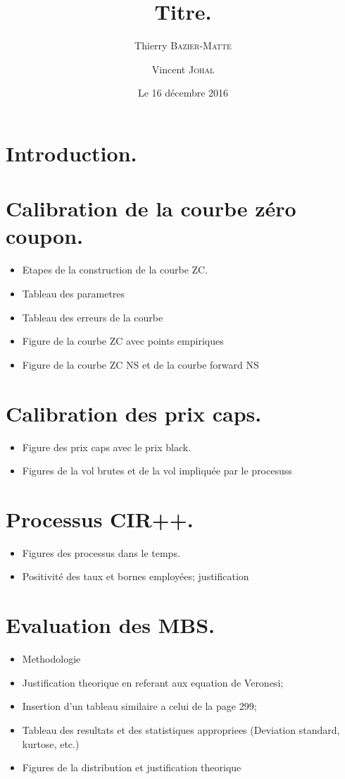 \documentclass{article}
\title{Titre.}
\author{Thierry \textsc{Bazier-Matte} \and Vincent \textsc{Johal}}
\date{Le 16 décembre 2016}
\begin{document}
\maketitle

\section{Introduction.}

\section{Calibration de la courbe zéro coupon.}

\begin{itemize}
\item Etapes de la construction de la courbe ZC.
\item Tableau des parametres
\item Tableau des erreurs de la courbe
\item Figure de la courbe ZC avec points empiriques
\item Figure de la courbe ZC NS et de la courbe forward NS
\end{itemize}

\section{Calibration des prix caps.}

\begin{itemize}
\item Figure des prix caps avec le prix black.
\item Figures de la vol brutes et de la vol impliquée par le procesuss
\end{itemize}

\section{Processus CIR++.}
\begin{itemize}
\item Figures des processus dans le temps.
\item Positivité des taux et bornes employées; justification
\end{itemize}

\section{Evaluation des MBS.}
\begin{itemize}
\item Methodologie
\item Justification theorique en referant aux equation de Veronesi;
\item Insertion d'un tableau similaire a celui de la page 299;
\item Tableau des resultats et des statistiques appropriees (Deviation standard, kurtose,
  etc.)
\item Figures de la distribution et justification theorique
\end{itemize}
\end{document}
